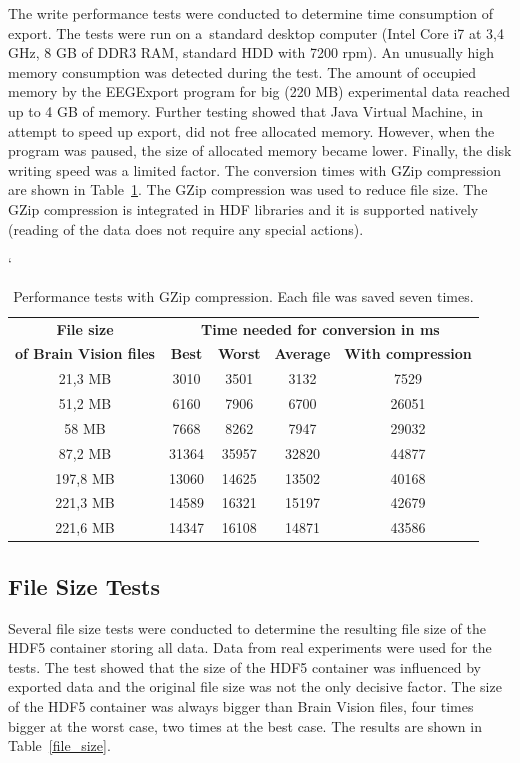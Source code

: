\documentclass[conference]{IEEEtran}
\begin{document}
The write performance tests were conducted to determine time consumption of export. The tests were run on a~standard desktop computer (Intel Core i7 at 3,4 GHz, 8 GB of DDR3 RAM, standard HDD with 7200 rpm). An unusually high memory consumption was detected during the test. The amount of occupied memory by the EEGExport program for big (220 MB) experimental data reached up to 4 GB of memory. Further testing showed that Java Virtual Machine, in attempt to speed up export, did not free allocated memory. However, when the program was paused, the size of allocated memory became lower. Finally, the disk writing speed was a limited factor. The conversion times with GZip compression are shown in Table~\ref{speed_test}. The GZip compression was used to reduce file size. The GZip compression is integrated in HDF libraries and it is supported natively (reading of the data does not require any special actions).

\begin{table}
	\catcode`
	\centering
	\caption{Performance tests with GZip compression. Each file was saved seven times.}
	\label{speed_test}
	\begin{tabular}{|c|c|c|c|c|}
		\hline
		\textbf{File size} & \multicolumn{4}{c|}{\textbf{Time needed for conversion in ms}}\\
		\cline{2-5}		
		\textbf{ of Brain Vision files}	&\textbf{Best} & \textbf{Worst} & \textbf{Average} & \textbf{With compression}\\
		\hline
		\hline 21,3 MB & 3010 & 3501  & 3132& 7529 \\ 	
		\hline 51,2 MB & 6160  & 7906 & 6700 & 26051\\
		\hline 58 MB & 7668 &  8262 &  7947& 29032\\
		\hline 87,2 MB & 31364 & 35957 & 32820& 44877\\
		\hline 197,8 MB & 13060  & 14625 &  13502& 40168\\ 		
		\hline 221,3 MB & 14589 & 16321 & 15197& 42679 \\
		\hline 221,6 MB & 14347  & 16108 & 14871& 43586\\
		\hline
	\end{tabular}
\end{table}


\subsection{File Size Tests}
Several file size tests were conducted to determine the resulting file size of the HDF5 container storing all data. Data from real experiments were used for the tests. The test showed that the size of the HDF5 container was influenced by exported data and the original file size was not the only decisive factor. The size of the HDF5 container was always bigger than Brain Vision files, four times bigger at the worst case, two times at the best case. The results are shown in Table~\ref{file_size}. 
\end{document}

